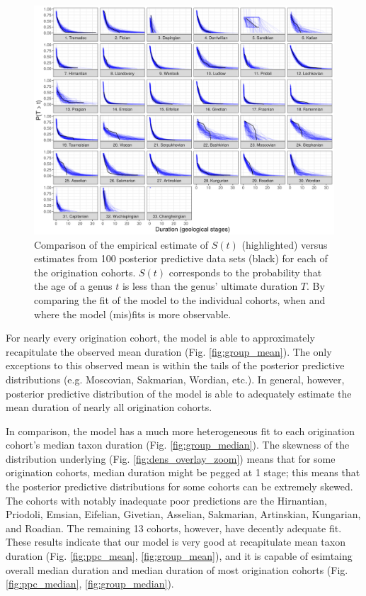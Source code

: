 \documentclass[11pt]{article}
\begin{document}
\begin{figure}[ht]
  \centering
  \includegraphics[height = 0.5\textheight,width=\textwidth,keepaspectratio=true]{figure/ppc_surv_coh}
  \caption{Comparison of the empirical estimate of \(S(t)\) (highlighted) versus estimates from 100 posterior predictive data sets (black) for each of the origination cohorts. \(S(t)\) corresponds to the probability that the age of a genus \(t\) is less than the genus' ultimate duration \(T\). By comparing the fit of the model to the individual cohorts, when and where the model (mis)fits is more observable. }
  \label{fig:surv_group}
\end{figure}


For nearly every origination cohort, the model is able to approximately recapitulate the observed mean duration (Fig. \ref{fig:group_mean}). The only exceptions to this observed mean is within the tails of the posterior predictive distributions (e.g. Moscovian, Sakmarian, Wordian, etc.). In general, however, posterior predictive distribution of the model is able to adequately estimate the mean duration of nearly all origination cohorts.

In comparison, the model has a much more heterogeneous fit to each origination cohort's median taxon duration (Fig. \ref{fig:group_median}). The skewness of the distribution underlying (Fig. \ref{fig:dens_overlay_zoom}) means that for some origination cohorts, median duration might be pegged at 1 stage; this means that the posterior predictive distributions for some cohorts can be extremely skewed. The cohorts with notably inadequate poor predictions are the Hirnantian, Priodoli, Emsian, Eifelian, Givetian, Asselian, Sakmarian, Artinskian, Kungarian, and Roadian. The remaining 13 cohorts, however, have decently adequate fit. These results indicate that our model is very good at recapitulate mean taxon duration (Fig. \ref{fig:ppc_mean}, \ref{fig:group_mean}), and it is capable of esimtaing overall median duration and median duration of most origination cohorts (Fig. \ref{fig:ppc_median}, \ref{fig:group_median}).
\end{document}

